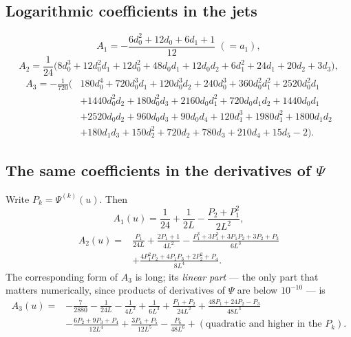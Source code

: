 \documentclass[11pt,oneside]{article}
\theoremstyle{definition}
\theoremstyle{remark}
\begin{document}
\subsection{Logarithmic coefficients in the jets}

\[
  A_1=-\frac{6d_0^2+12d_0+6d_1+1}{12}\;(=a_1),
\]
\begin{equation}\label{eq:A2jets}
  A_2=\frac{1}{24}\bigl(8d_0^3+12d_0^2d_1+12d_0^2+48d_0d_1+12d_0d_2
      +6d_1^2+24d_1+20d_2+3d_3\bigr),
\end{equation}
\begin{equation}\label{eq:A3jets}
\begin{aligned}
  A_3=-\frac{1}{720}\bigl(&180d_0^4+720d_0^3d_1+120d_0^3d_2+240d_0^3
    +360d_0^2d_1^2+2520d_0^2d_1\\
   &+1440d_0^2d_2+180d_0^2d_3+2160d_0d_1^2+720d_0d_1d_2+1440d_0d_1\\
   &+2520d_0d_2+960d_0d_3+90d_0d_4+120d_1^3+1980d_1^2+1800d_1d_2\\
   &+180d_1d_3+150d_2^2+720d_2+780d_3+210d_4+15d_5-2\bigr).
\end{aligned}
\end{equation}

\subsection{The same coefficients in the derivatives of \texorpdfstring{$\Psi$}{Psi}}

Write $P_k=\Psi^{(k)}(u)$.  Then
\[
  A_1(u)=\frac1{24}+\frac1{2L}-\frac{P_2+P_1^2}{2L^2},
\]
\begin{equation}\label{eq:A2psi}
\begin{aligned}
  A_2(u)={}&\frac{P_1}{24L}
    +\frac{2P_1+1}{4L^2}
    -\frac{P_1^3+3P_1^2+3P_1P_2+3P_2+P_3}{6L^3}\\
   &+\frac{4P_1^2P_2+4P_1P_3+2P_2^2+P_4}{8L^4}.
\end{aligned}
\end{equation}
The corresponding form of $A_3$ is long; its \emph{linear part} --- the only
part that matters numerically, since products of derivatives of $\Psi$ are
below $10^{-10}$ --- is
\begin{equation}\label{eq:A3psi}
\begin{aligned}
  A_3(u)={}&-\frac7{2880}-\frac1{24L}-\frac1{4L^2}+\frac1{6L^3}
    +\frac{P_1+P_2}{24L^2}
    +\frac{48P_1+24P_2-P_3}{48L^3}\\
   &-\frac{6P_2+9P_3+P_4}{12L^4}
    +\frac{3P_4+P_5}{12L^5}
    -\frac{P_6}{48L^6}
    +(\text{quadratic and higher in the }P_k).
\end{aligned}
\end{equation}
\end{document}
